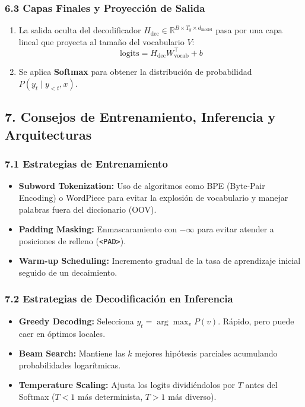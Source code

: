 \subsubsection{6.3 Capas Finales y Proyección de Salida}

\begin{enumerate}
	\item La salida oculta del decodificador $H_{\text{dec}} \in \mathbb{R}^{B \times T_y \times d_{\text{model}}}$ pasa por una capa lineal que proyecta al tamaño del vocabulario $V$:
	$$\text{logits} = H_{\text{dec}} W_{\text{vocab}}^\top + b$$
	\item Se aplica \textbf{Softmax} para obtener la distribución de probabilidad $P(y_t \mid y_{<t}, x)$.
\end{enumerate}

\subsection{7. Consejos de Entrenamiento, Inferencia y Arquitecturas}

\subsubsection{7.1 Estrategias de Entrenamiento}

\begin{itemize}
	\item \textbf{Subword Tokenization:} Uso de algoritmos como BPE (Byte-Pair Encoding) o WordPiece para evitar la explosión de vocabulario y manejar palabras fuera del diccionario (OOV).
	\item \textbf{Padding Masking:} Enmascaramiento con $-\infty$ para evitar atender a posiciones de relleno (\texttt{<PAD>}).
	\item \textbf{Warm-up Scheduling:} Incremento gradual de la tasa de aprendizaje inicial seguido de un decaimiento.
\end{itemize}

\subsubsection{7.2 Estrategias de Decodificación en Inferencia}

\begin{itemize}
	\item \textbf{Greedy Decoding:} Selecciona $y_t = \arg\max_v P(v)$. Rápido, pero puede caer en óptimos locales.
	\item \textbf{Beam Search:} Mantiene las $k$ mejores hipótesis parciales acumulando probabilidades logarítmicas.
	\item \textbf{Temperature Scaling:} Ajusta los logits dividiéndolos por $T$ antes del Softmax ($T < 1$ más determinista, $T > 1$ más diverso).
\end{itemize}

